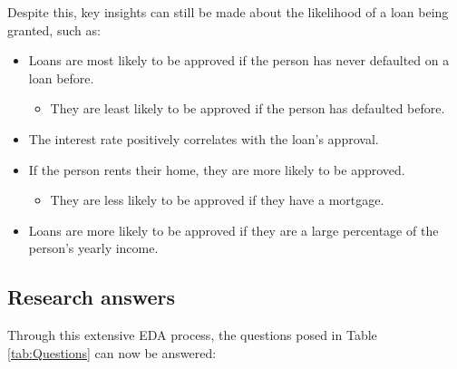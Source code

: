 
\pagebreak 
\noindent Despite this, key insights can still be made about the likelihood of a loan being granted, such as:

\begin{itemize}
    \item Loans are most likely to be approved if the person has never defaulted on a loan before.
    \begin{itemize}
        \item They are least likely to be approved if the person has defaulted before.
    \end{itemize}
    \item The interest rate positively correlates with the loan's approval.
    \item If the person rents their home, they are more likely to be approved.
    \begin{itemize}
        \item They are less likely to be approved if they have a mortgage.
    \end{itemize}
    \item Loans are more likely to be approved if they are a large percentage of the person's yearly income.
\end{itemize}

\subsection{Research answers}
Through this extensive EDA process, the questions posed in Table \ref{tab:Questions} can now be answered:

